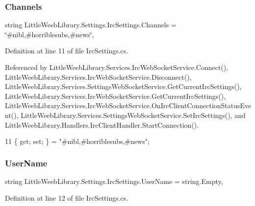 \subsubsection{\texorpdfstring{Channels}{Channels}}
{\footnotesize\ttfamily string Little\+Weeb\+Library.\+Settings.\+Irc\+Settings.\+Channels = \char`\"{}\#nibl,\#horriblesubs,\#news\char`\"{}\hspace{0.3cm}{\ttfamily [get]}, {\ttfamily [set]}}



Definition at line 11 of file Irc\+Settings.\+cs.



Referenced by Little\+Weeb\+Library.\+Services.\+Irc\+Web\+Socket\+Service.\+Connect(), Little\+Weeb\+Library.\+Services.\+Irc\+Web\+Socket\+Service.\+Disconnect(), Little\+Weeb\+Library.\+Services.\+Settings\+Web\+Socket\+Service.\+Get\+Current\+Irc\+Settings(), Little\+Weeb\+Library.\+Services.\+Irc\+Web\+Socket\+Service.\+Get\+Current\+Irc\+Settings(), Little\+Weeb\+Library.\+Services.\+Irc\+Web\+Socket\+Service.\+On\+Irc\+Client\+Connection\+Status\+Event(), Little\+Weeb\+Library.\+Services.\+Settings\+Web\+Socket\+Service.\+Set\+Irc\+Settings(), and Little\+Weeb\+Library.\+Handlers.\+Irc\+Client\+Handler.\+Start\+Connection().


\begin{DoxyCode}
11 \{ \textcolor{keyword}{get}; \textcolor{keyword}{set}; \} = \textcolor{stringliteral}{"#nibl,#horriblesubs,#news"};
\end{DoxyCode}
\mbox{\label{class_little_weeb_library_1_1_settings_1_1_irc_settings_a1a400295f11e155e37002041410e47f1}} 
\subsubsection{\texorpdfstring{User\+Name}{UserName}}
{\footnotesize\ttfamily string Little\+Weeb\+Library.\+Settings.\+Irc\+Settings.\+User\+Name = string.\+Empty\hspace{0.3cm}{\ttfamily [get]}, {\ttfamily [set]}}



Definition at line 12 of file Irc\+Settings.\+cs.




